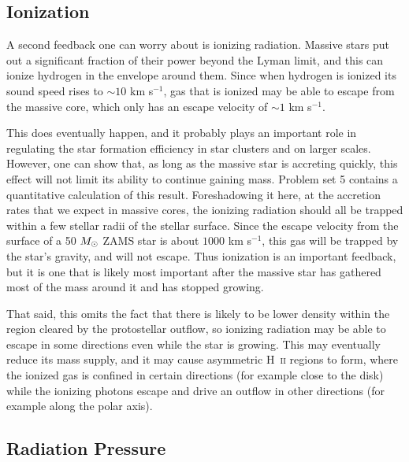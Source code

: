 \subsection{Ionization}

A second feedback one can worry about is ionizing radiation. Massive stars put out a significant fraction of their power beyond the Lyman limit, and this can ionize hydrogen in the envelope around them. Since when hydrogen is ionized its sound speed rises to $\sim 10$ km s$^{-1}$, gas that is ionized may be able to escape from the massive core, which only has an escape velocity of $\sim 1$ km s$^{-1}$.

This does eventually happen, and it probably plays an important role in regulating the star formation efficiency in star clusters and on larger scales. However, one can show that, as long as the massive star is accreting quickly, this effect will not limit its ability to continue gaining mass. Problem set 5 contains a quantitative calculation of this result. Foreshadowing it here, at the accretion rates that we expect in massive cores, the ionizing radiation should all be trapped within a few stellar radii of the stellar surface. Since the escape velocity from the surface of a 50 $M_{\odot}$ ZAMS star is about $1000$ km s$^{-1}$, this gas will be trapped by the star's gravity, and will not escape. Thus ionization is an important feedback, but it is one that is likely most important after the massive star has gathered most of the mass around it and has stopped growing.

That said, this omits the fact that there is likely to be lower density within the region cleared by the protostellar outflow, so ionizing radiation may be able to escape in some directions even while the star is growing. This may eventually reduce its mass supply, and it may cause asymmetric H~\textsc{ii} regions to form, where the ionized gas is confined in certain directions (for example close to the disk) while the ionizing photons escape and drive an outflow in other directions (for example along the polar axis).

\subsection{Radiation Pressure}

